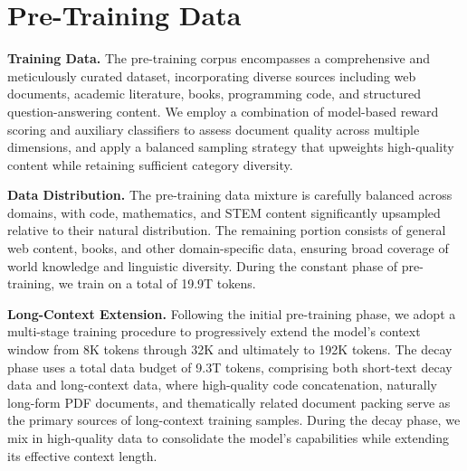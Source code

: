 \section{Pre-Training Data}

\noindent \textbf{Training Data.} The pre-training corpus encompasses a comprehensive and meticulously curated dataset, incorporating diverse sources including web documents, academic literature, books, programming code, and structured question-answering content. We employ a combination of model-based reward scoring and auxiliary classifiers to assess document quality across multiple dimensions, and apply a balanced sampling strategy that upweights high-quality content while retaining sufficient category diversity.

\noindent \textbf{Data Distribution.} The pre-training data mixture is carefully balanced across domains, with code, mathematics, and STEM content significantly upsampled relative to their natural distribution. The remaining portion consists of general web content, books, and other domain-specific data, ensuring broad coverage of world knowledge and linguistic diversity. During the constant phase of pre-training, we train on a total of 19.9T tokens.

\noindent \textbf{Long-Context Extension.} Following the initial pre-training phase, we adopt a multi-stage training procedure to progressively extend the model's context window from 8K tokens through 32K and ultimately to 192K tokens. The decay phase uses a total data budget of 9.3T tokens, comprising both short-text decay data and long-context data, where high-quality code concatenation, naturally long-form PDF documents, and thematically related document packing serve as the primary sources of long-context training samples. During the decay phase, we mix in high-quality data to consolidate the model's capabilities while extending its effective context length.
